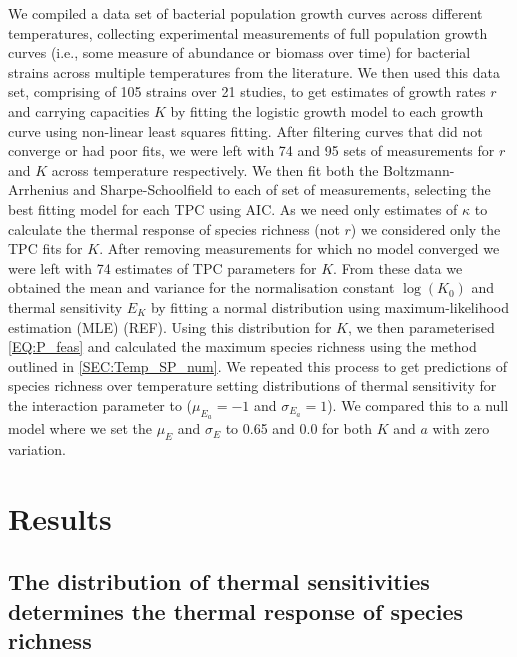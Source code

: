 \documentclass{article}
\begin{document}
We compiled a data set of bacterial population growth curves across different temperatures, collecting experimental measurements of full population growth curves (i.e., some measure of abundance or biomass over time) for bacterial strains across multiple temperatures from the literature. We then used this data set, comprising of 105 strains over 21 studies, to get estimates of growth rates $r$ and carrying capacities $K$ by fitting the logistic growth model to each growth curve using non-linear least squares fitting. After filtering curves that did not converge or had poor fits, we were left with 74 and 95 sets of measurements for $r$ and $K$ across temperature respectively. We then fit both the Boltzmann-Arrhenius and Sharpe-Schoolfield \citep{Schoolfield1981} to each of set of measurements, selecting the best fitting model for each TPC using AIC. As we need only estimates of $\kappa$ to calculate the thermal response of species richness  (not $r$) we considered only the TPC fits for $K$. After removing measurements for which no model converged we were left with 74 estimates of TPC parameters for $K$. From these data we obtained the mean and variance for the normalisation constant $\log(K_0)$ and thermal sensitivity $E_K$ by fitting a normal distribution using maximum-likelihood estimation (MLE) (REF). Using this distribution for $K$, we then parameterised \cref{EQ:P_feas} and calculated the maximum species richness using the method outlined in \cref{SEC:Temp_SP_num}. We repeated this process to get predictions of species richness over temperature setting distributions of thermal sensitivity for the interaction parameter to ($\mu_{E_a} = -1$ and $\sigma_{E_a} = 1$). We compared this to a null model where we set the $\mu_E$ and $\sigma_E$ to 0.65 and 0.0 for both $K$ and $a$ with zero variation.

\section*{Results}

\subsection*{The distribution of thermal sensitivities determines the thermal response of species richness}
\end{document}

